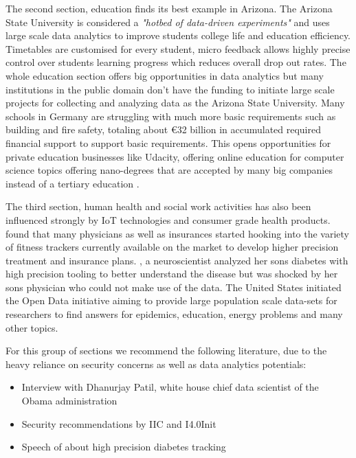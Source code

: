 The second section, education finds its best example in Arizona. The Arizona State University is considered a \emph{"hotbed of data-driven experiments"}\cite{asutimes:2012} and uses large scale data analytics to improve students college life and education efficiency. Timetables are customised for every student, micro feedback allows highly precise control over students learning progress which reduces overall drop out rates. The whole education section offers big opportunities in data analytics but many institutions in the public domain don't have the funding to initiate large scale projects for collecting and analyzing data as the Arizona State University. Many schools in Germany are struggling with much more basic requirements such as building and fire safety, totaling about \euro{}32 billion in accumulated required financial support to support basic requirements\cite{schulen:2015}. This opens opportunities for private education businesses like Udacity, offering online education for computer science topics offering nano-degrees that are accepted by many big companies instead of a tertiary education \cite{udacity:2016}.


The third section, human health and social work activities has also been influenced strongly by \ac{IoT} technologies and consumer grade health products. \citeauthor{YIN20163} found that many physicians as well as insurances started hooking into the variety of fitness trackers currently available on the market to develop higher precision treatment and insurance plans. \citeauthor{diabetis:2014}, a neuroscientist analyzed her sons diabetes with high precision tooling to better understand the disease but was shocked by her sons physician who could not make use of the data. The United States initiated the Open Data initiative aiming to provide large population scale data-sets for researchers to find answers for epidemics, education, energy problems and many other topics. 

For this group of sections we recommend the following literature, due to the heavy reliance on security concerns as well as data analytics potentials:
\begin{itemize}
    \item Interview with Dhanurjay Patil, white house chief data scientist of the Obama administration \cite{derivwhitehouse:2016}
    \item Security recommendations by \ac{IIC} and \ac{I4.0Init}
    \item Speech of \citeauthor{diabetis:2014} about high precision diabetes tracking \cite{diabetis:2014}
\end{itemize}


